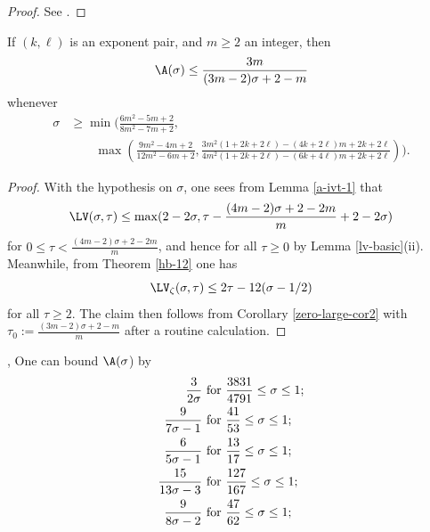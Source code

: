 \begin{proof}  See \cite[(11.74)]{ivic}.
\end{proof}

\begin{lemma}\label{gzd}\cite[(11.76), (11.77)]{ivic} If $(k,\ell)$ is an exponent pair, and $m \geq 2$ an integer, then
$$ \A(\sigma) \leq \frac{3m}{(3m-2)\sigma + 2 - m}$$
whenever
\begin{align*}
\sigma &\geq \min\biggl( \frac{6m^2-5m+2}{8m^2-7m+2},\\
&\qquad \max\left( \frac{9m^2-4m+2}{12m^2-6m+2}, \frac{3m^2(1+2k+2\ell)-(4k+2\ell)m + 2k+2\ell}{4m^2(1+2k+2\ell)-(6k+4\ell)m + 2k+2\ell} \right) \biggr).
\end{align*}
\end{lemma}

\begin{proof} With the hypothesis on $\sigma$, one sees from Lemma \ref{a-ivt-1} that
$$ \LV(\sigma,\tau) \leq \max( 2 - 2 \sigma, \tau - \frac{(4m-2)\sigma + 2-2m}{m} + 2-2\sigma)$$
for $0 \leq \tau < \frac{(4m-2)\sigma + 2-2m}{m}$, and hence for all $\tau \geq 0$ by Lemma \ref{lv-basic}(ii).  Meanwhile, from Theorem \ref{hb-12} one has
$$\LV_\zeta(\sigma,\tau) \leq 2\tau - 12 (\sigma-1/2)$$
for all $\tau \geq 2$.  The claim then follows from Corollary
\ref{zero-large-cor2} with $\tau_0 := \frac{(3m-2)\sigma+2-m}{m}$ after a routine calculation.
\end{proof}

\begin{corollary}\label{further_ivic_zero}\cite{ivic_exponent_pairs}, \cite[Theorem 11.4]{ivic} One can bound $\A(\sigma$) by
\begin{align*}
 \frac{3}{2\sigma} &\hbox{ for } \frac{3831}{4791} \leq \sigma \leq 1;\\
 \frac{9}{7\sigma-1} &\hbox{ for } \frac{41}{53} \leq \sigma \leq 1; \\
 \frac{6}{5\sigma-1} &\hbox{ for } \frac{13}{17} \leq \sigma \leq 1; \\
 \frac{15}{13\sigma-3} &\hbox{ for } \frac{127}{167} \leq \sigma \leq 1; \\
 \frac{9}{8\sigma-2} &\hbox{ for } \frac{47}{62} \leq \sigma \leq 1;
\end{align*}
\end{corollary}
\literature
{}
\derived
{}

